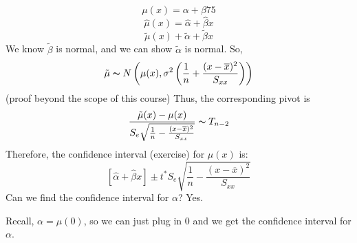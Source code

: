 \[ \mu(x)=\alpha+\beta 75 \]
\[ \hat{\mu}(x)=\hat{\alpha}+\hat{\beta}x \]
\[ \tilde{\mu}(x)+\tilde{\alpha}+\tilde{\beta}x \]
We know $ \tilde{\beta} $ is normal, and we can show $ \tilde{\alpha} $ is normal.
So,
\[ \tilde{\mu} \thicksim N \left( \mu(x),\sigma^2
    \left( \frac{1}{n} +\frac{(x-\overline{x})^2}{S_{xx}} \right) \right) \]
(proof beyond the scope of this course)
Thus, the corresponding pivot is
\[ \frac{\tilde{\mu}(x)-\mu(x)}{S_{e}\sqrt{\frac{1}{n}-\frac{(x-\overline{x})^2}{S_{xx}}}}
    \thicksim T_{n-2} \]
Therefore, the confidence interval (exercise) for $ \mu(x) $ is:
\[ \left[ \hat{\alpha}+\hat{\beta}x \right]
    \pm
    t^* S_e \sqrt{\frac{1}{n}-\frac{(x-\overline{x})^2}{S_{xx}}} \]
Can we find the confidence interval for $ \alpha $? Yes.

Recall, $ \alpha=\mu(0) $, so we can just plug in $ 0 $ and we get the confidence
interval for $ \alpha $.
